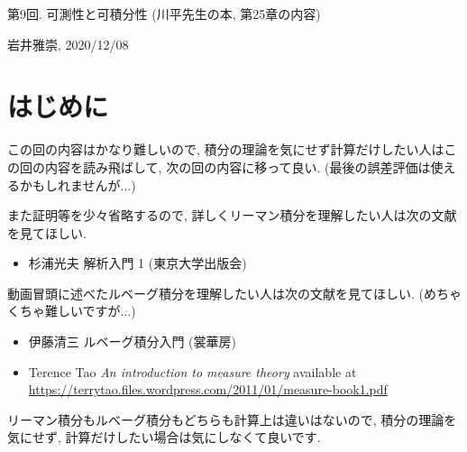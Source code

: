 \documentclass[dvipdfmx,a4paper,11pt]{article}
\theoremstyle{definition}
\begin{document}
\begin{center}
{\Large 第9回. 可測性と可積分性 (川平先生の本, 第25章の内容)}
\end{center}

\begin{flushright}
 岩井雅崇, 2020/12/08
\end{flushright}
 \section{はじめに}
 この回の内容はかなり難しいので, 積分の理論を気にせず計算だけしたい人はこの回の内容を読み飛ばして, 次の回の内容に移って良い.
 (最後の誤差評価は使えるかもしれませんが...)
 
 また証明等を少々省略するので, 詳しくリーマン積分を理解したい人は次の文献を見てほしい.
 \begin{itemize}
 \item 杉浦光夫 解析入門 1 (東京大学出版会)
 \end{itemize}
 
動画冒頭に述べたルベーグ積分を理解したい人は次の文献を見てほしい.
(めちゃくちゃ難しいですが...)
 \begin{itemize}
 \item 伊藤清三 ルベーグ積分入門 (裳華房)
 \item Terence Tao \textit{An introduction to measure theory}
 available at \url{https://terrytao.files.wordpress.com/2011/01/measure-book1.pdf}
 \end{itemize}
 
リーマン積分もルベーグ積分もどちらも計算上は違いはないので, 積分の理論を気にせず, 計算だけしたい場合は気にしなくて良いです.
\end{document}
